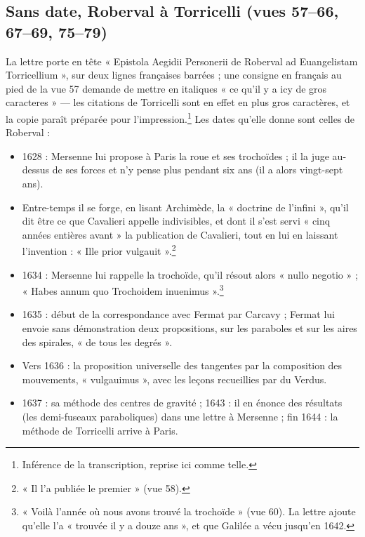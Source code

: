 \documentclass[11pt,a4paper]{article}
\begin{document}
\subsection*{Sans date, Roberval à Torricelli (vues 57--66, 67--69, 75--79)}

La lettre porte en tête « Epistola Aegidii Personerii de Roberval ad Euangelistam
Torricellium », sur deux lignes françaises barrées ; une consigne en français au
pied de la vue 57 demande de mettre en italiques « ce qu'il y a icy de gros
caracteres » — les citations de Torricelli sont en effet en plus gros
caractères, et la copie paraît préparée pour l'impression.\footnote{Inférence
de la transcription, reprise ici comme telle.} Les dates qu'elle donne sont
celles de Roberval :

\begin{itemize}
  \item 1628 : Mersenne lui propose à Paris la roue et ses trochoïdes ; il la
    juge au-dessus de ses forces et n'y pense plus pendant six ans (il a alors
    vingt-sept ans).
  \item Entre-temps il se forge, en lisant Archimède, la « doctrine de
    l'infini », qu'il dit être ce que Cavalieri appelle indivisibles, et dont il
    s'est servi « cinq années entières avant » la publication de Cavalieri, tout
    en lui en laissant l'invention : « Ille prior vulgauit ».\footnote{« Il l'a
    publiée le premier » (vue 58).}
  \item 1634 : Mersenne lui rappelle la trochoïde, qu'il résout alors « nullo
    negotio » ; « Habes annum quo Trochoidem inuenimus ».\footnote{« Voilà
    l'année où nous avons trouvé la trochoïde » (vue 60). La lettre ajoute
    qu'elle l'a « trouvée il y a douze ans », et que Galilée a vécu jusqu'en
    1642.}
  \item 1635 : début de la correspondance avec Fermat par Carcavy ; Fermat lui
    envoie sans démonstration deux propositions, sur les paraboles et sur les
    aires des spirales, « de tous les degrés ».
  \item Vers 1636 : la proposition universelle des tangentes par la composition
    des mouvements, « vulgauimus », avec les leçons recueillies par du Verdus.
  \item 1637 : sa méthode des centres de gravité ; 1643 : il en énonce des
    résultats (les demi-fuseaux paraboliques) dans une lettre à Mersenne ; fin
    1644 : la méthode de Torricelli arrive à Paris.
\end{itemize}
\end{document}
